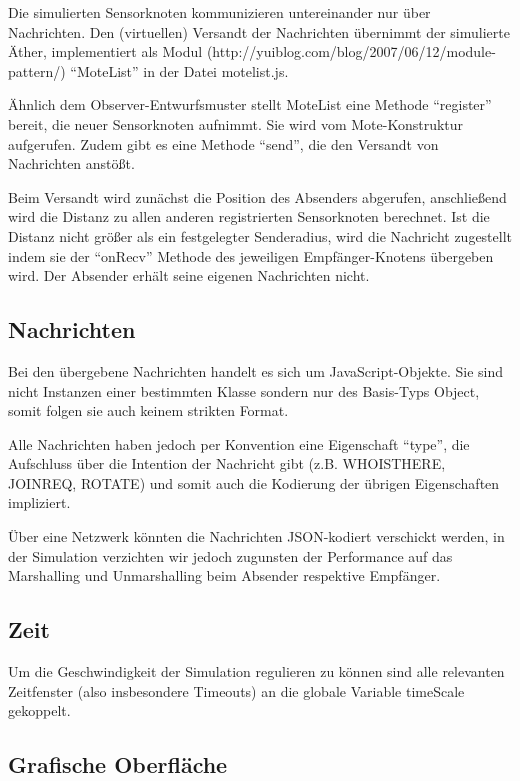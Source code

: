Die simulierten Sensorknoten kommunizieren untereinander nur über
Nachrichten. Den (virtuellen) Versandt der Nachrichten übernimmt der
simulierte Äther, implementiert als Modul
(http://yuiblog.com/blog/2007/06/12/module-pattern/) ``MoteList'' in der
Datei motelist.js.

Ähnlich dem Observer-Entwurfsmuster stellt MoteList eine Methode
``register'' bereit, die neuer Sensorknoten aufnimmt. Sie wird vom
Mote-Konstruktur aufgerufen. Zudem gibt es eine Methode ``send'', die
den Versandt von Nachrichten anstößt.

Beim Versandt wird zunächst die Position des Absenders abgerufen,
anschließend wird die Distanz zu allen anderen registrierten
Sensorknoten berechnet. Ist die Distanz nicht größer als ein
festgelegter Senderadius, wird die Nachricht zugestellt indem sie der
``onRecv'' Methode des jeweiligen Empfänger-Knotens übergeben wird. Der
Absender erhält seine eigenen Nachrichten nicht.

\subsection{Nachrichten}

Bei den übergebene Nachrichten handelt es sich um JavaScript-Objekte.
Sie sind nicht Instanzen einer bestimmten Klasse sondern nur des
Basis-Typs Object, somit folgen sie auch keinem strikten Format.

Alle Nachrichten haben jedoch per Konvention eine Eigenschaft ``type'',
die Aufschluss über die Intention der Nachricht gibt (z.B. WHOISTHERE,
JOINREQ, ROTATE) und somit auch die Kodierung der übrigen Eigenschaften
impliziert.

Über eine Netzwerk könnten die Nachrichten JSON-kodiert verschickt
werden, in der Simulation verzichten wir jedoch zugunsten der
Performance auf das Marshalling und Unmarshalling beim Absender
respektive Empfänger.

\subsection{Zeit}

Um die Geschwindigkeit der Simulation regulieren zu können sind alle
relevanten Zeitfenster (also insbesondere Timeouts) an die globale
Variable timeScale gekoppelt.

\subsection{Grafische Oberfläche}

